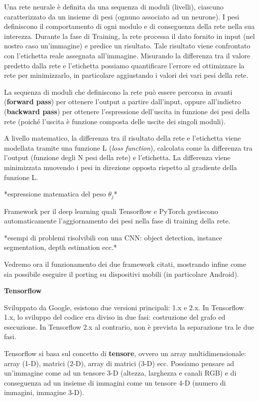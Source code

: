 \documentclass[a4paper,oneside]{book}
\begin{document}
    Una rete neurale è definita da una sequenza di moduli
    (livelli), ciascuno caratterizzato da un insieme di pesi (ognuno associato ad un neurone). 
    I pesi definiscono il comportamento di ogni modulo e di conseguenza della rete nella sua interezza. 
    Durante la fase di Training, la rete processa il dato fornito in input (nel nostro caso un'immagine)
    e predice un risultato. Tale risultato viene confrontato con l'etichetta reale assegnata all'immagine. 
    Misurando la differenza tra il valore predetto dalla rete e l'etichetta possiamo quantificare l'errore 
    ed ottimizzare la rete per minimizzarlo, in particolare aggiustando i valori dei vari pesi della rete.

    La sequenza di moduli che definiscono la rete può essere percorsa
    in avanti (\textbf{forward pass}) per ottenere l'output a partire dall'input,
    oppure all'indietro (\textbf{backward pass}) per ottenere l'espressione
    dell'uscita in funzione dei pesi della rete (poiché l'uscita è funzione composta
    delle uscite dei singoli moduli).

    A livello matematico, la differenza tra il risultato della rete e l'etichetta viene modellata tramite una funzione L 
    (\textit{loss function}), calcolata come la differenza tra l'output (funzione degli N pesi della rete) e l'etichetta. 
    La differenza viene minimizzata muovendo i pesi in direzione opposta rispetto al gradiente della funzione L.

    *espressione matematica del peso $\theta_j$*

    Framework per il deep learning quali Tensorflow e PyTorch gestiscono automaticamente 
    l'aggiornamento dei pesi nella fase di training della rete.

    *esempi di problemi risolvibili con una CNN: object detection, instance segmentation, depth estimation ecc.*

    Vedremo ora il funzionamento dei due framework citati, mostrando infine
    come sia possibile eseguire il porting su dispositivi mobili (in particolare Android).

    \textbf{Tensorflow}

    Sviluppato da Google, esistono due versioni principali:
    1.x e 2.x.
    In Tensorflow 1.x, lo sviluppo del codice era diviso in 
    due fasi: costruzione del grafo ed esecuzione.
    In Tensorflow 2.x al contrario, non è prevista la separazione tra le due fasi.

    Tensorflow si basa sul concetto di \textbf{tensore}, ovvero
    un array multidimensionale: array (1-D), matrici (2-D), array di matrici (3-D) ecc.
    Possiamo pensare ad un'immagine come ad un tensore 3-D (altezza, larghezza e
    canali RGB) e di conseguenza ad un insieme di immagini come un tensore 4-D (numero di immagini, immagine 3-D).
\end{document}
